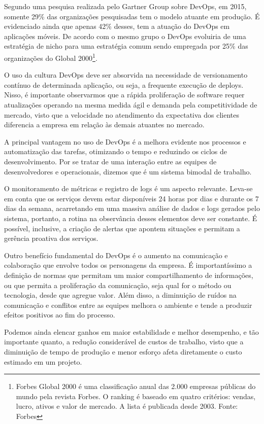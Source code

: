 Segundo uma pesquisa realizada pelo Gartner Group sobre DevOps, em 2015, somente 29\% das organizações pesquisadas tem o modelo atuante em produção. É evidenciado ainda que apenas 42\% desses, tem a atuação do DevOps em aplicações móveis. De acordo com o mesmo grupo o DevOps evoluiria de uma estratégia de nicho para uma estratégia comum sendo empregada por 25\% das organizações do Global 2000\footnote{Forbes Global 2000 é uma classificação anual das 2.000 empresas públicas do mundo pela revista Forbes. O ranking é baseado em quatro critérios: vendas, lucro, ativos e valor de mercado. A lista é publicada desde 2003. Fonte: Forbes}.\cite{gartnerglobal}

O uso da cultura DevOps deve ser absorvida na necessidade de versionamento contínuo de determinada aplicação, ou seja, a frequente execução de deploys. Nisso, é importante observarmos que a rápida proliferação de software requer atualizações operando na mesma medida ágil e demanda pela competitividade de mercado, visto que a velocidade no atendimento da expectativa dos clientes diferencia a empresa em relação às demais atuantes no mercado.

A principal vantagem no uso de DevOps é a melhora evidente nos processos e automatização das tarefas, otimizando o tempo e reduzindo os ciclos de desenvolvimento. Por se tratar de uma interação entre as equipes de desenvolvedores e operacionais, dizemos que é um sistema bimodal de trabalho.\cite{sato2014devops}

O monitoramento de métricas e registro de logs é um aspecto relevante. Leva-se em conta que os serviços devem estar disponíveis 24 horas por dias e durante os 7 dias da semana, acarretando em uma massiva análise de dados e logs gerados pelo sistema, portanto, a rotina na observância desses elementos deve ser constante. É possível, inclusive, a criação de alertas que apontem situações e permitam a gerência proativa dos serviços.

Outro benefício fundamental do DevOps é o aumento na comunicação e colaboração que envolve todos os personagens da empresa. É importantíssimo a definição de normas que permitam um maior compartilhamento de informações, ou que permita a proliferação da comunicação, seja qual for o método ou tecnologia, desde que agregue valor. Além disso, a diminuição de ruídos na comunicação e conflitos entre as equipes melhora o ambiente e tende a produzir efeitos positivos ao fim do processo.\cite{gaea}

Podemos ainda elencar ganhos em maior estabilidade e melhor desempenho, e tão importante quanto, a redução considerável de custos de trabalho, visto que a diminuição de tempo de produção e menor esforço afeta diretamente o custo estimado em um projeto.


